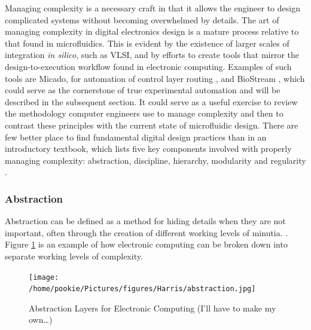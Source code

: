 \documentclass[11pt,journal,compsoc, onecolumn]{IEEEtran}
\begin{document}
Managing complexity is a necessary craft in that it allows the engineer to
design complicated systems without becoming overwhelmed by
details. The art of managing complexity in digital electronics design is 
a mature process relative to that found in microfluidics. This is
evident by the existence of larger scales of integration \emph{in silico},
such as VLSI, and by efforts to create tools that mirror the
design-to-execution workflow found in electronic computing. Examples of such
tools are Micado, for automation of control layer routing \cite{amin2009}, and
BioStream \cite{thies2008}, which could serve as the cornerstone of true
experimental automation and will be described in the subsequent section.
It could serve as a useful exercise to review the methodology computer
engineers use to manage complexity and then to contrast these principles with
the current state of microfluidic design. There are few better place to find
fundamental digital design practices than in an introductory textbook, 
which lists five key components involved with properly managing complexity:
abstraction, discipline, hierarchy, modularity and regularity
\cite{Harris+Harris}.

\subsubsection{Abstraction}
Abstraction can be defined as a method for hiding details when they are not
important, often through the creation of different working levels of minutia.
\cite{Harris+Harris}. Figure \ref{fig:abstraction} is an example of how
electronic computing can be broken down into separate working levels of
complexity.

\begin{figure}[h]
	\centering
	\texttt{[image: /home/pookie/Pictures/figures/Harris/abstraction.jpg]}
	\caption{Abstraction Layers for Electronic Computing (I'll have to make
	my own\dots)}
	\label{fig:abstraction}
\end{figure}
\end{document}
